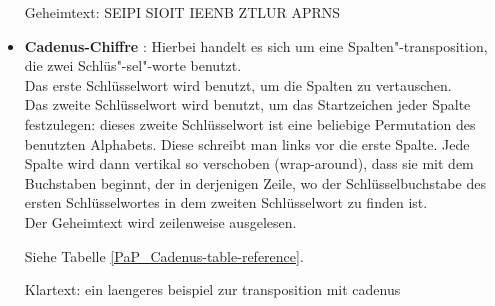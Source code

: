 \begin{refsegment}
\begin{itemize}
   Geheimtext: SEIPI SIOIT IEENB ZTLUR APRNS\\


\item {\bf Cadenus-Chiffre} \cite{ACA2002}:
   Hierbei handelt es sich um eine
   Spalten"-transposition, die zwei Schlüs"-sel"-worte benutzt.\\
   Das erste Schlüsselwort wird benutzt, um die Spalten zu vertauschen.\\
   Das zweite Schlüsselwort wird benutzt, um das Startzeichen jeder Spalte
   festzulegen: dieses zweite Schlüsselwort ist eine beliebige Permutation
   des benutzten Alphabets. Diese schreibt man links vor die erste Spalte.
   Jede Spalte wird dann vertikal so verschoben (wrap-around), dass sie mit dem
   Buchstaben beginnt, der in derjenigen Zeile, wo der Schlüsselbuchstabe des
   ersten Schlüsselwortes in dem zweiten Schlüsselwort zu finden ist.\\
   Der Geheimtext wird zeilenweise ausgelesen.

   Siehe Tabelle \ref{PaP_Cadenus-table-reference}.

   Klartext: ein laengeres beispiel zur transposition mit cadenus


\end{itemize}
\end{refsegment}
